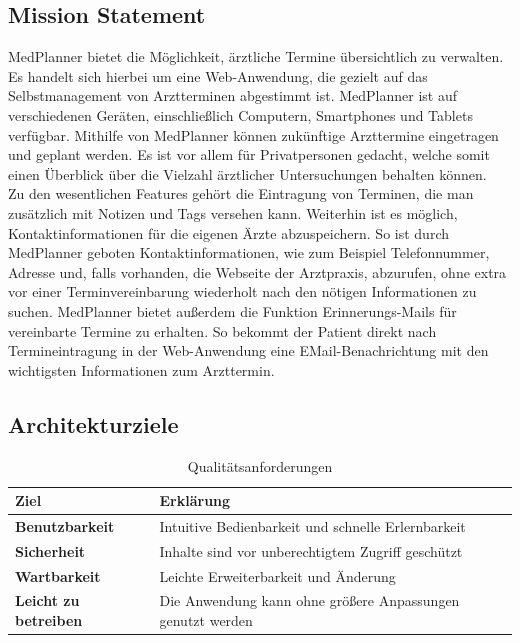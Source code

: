 \documentclass[conference]{IEEEtran}
\begin{document}
\subsection{Mission Statement}
MedPlanner bietet die Möglichkeit, ärztliche Termine übersichtlich zu verwalten. Es handelt sich hierbei um eine Web-Anwendung, die gezielt auf das Selbstmanagement von Arztterminen abgestimmt ist. MedPlanner ist auf verschiedenen Geräten, einschließlich Computern, Smartphones und Tablets verfügbar. Mithilfe von MedPlanner können zukünftige Arzttermine eingetragen und geplant werden. Es ist vor allem für Privatpersonen gedacht, welche somit einen Überblick über die Vielzahl ärztlicher Untersuchungen behalten können.\\
Zu den wesentlichen Features gehört die Eintragung von Terminen, die man zusätzlich mit Notizen und Tags versehen kann. Weiterhin ist es möglich, Kontaktinformationen für die eigenen Ärzte abzuspeichern. So ist durch MedPlanner geboten Kontaktinformationen, wie zum Beispiel Telefonnummer, Adresse und, falls vorhanden, die Webseite der Arztpraxis, abzurufen, ohne extra vor einer Terminvereinbarung wiederholt nach den nötigen Informationen zu suchen. MedPlanner bietet außerdem die Funktion Erinnerungs-Mails für vereinbarte Termine zu erhalten. So bekommt der Patient direkt nach Termineintragung in der Web-Anwendung eine EMail-Benachrichtung mit den wichtigsten Informationen zum Arzttermin.


\subsection{Architekturziele}
\begin{table}[!h]
	\caption{Qualitätsanforderungen}
	\begin{tabularx}{\columnwidth}{>{\bfseries}l|p{57mm}}
		\toprule
		\textbf{Ziel} & Erklärung\\
		\midrule
		Benutzbarkeit & Intuitive Bedienbarkeit und schnelle Erlernbarkeit\\
		Sicherheit & Inhalte sind vor unberechtigtem Zugriff geschützt\\
		Wartbarkeit & Leichte Erweiterbarkeit und Änderung\\
		Leicht zu betreiben & Die Anwendung kann ohne größere Anpassungen genutzt werden\\
		\bottomrule
	\end{tabularx}
\end{table}
\pagebreak
\end{document}
